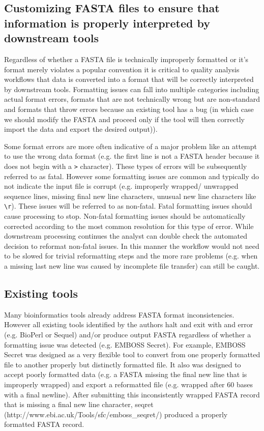 \subsection{Customizing FASTA files to ensure that information is properly interpreted by downstream tools}

Regardless of whether a FASTA file is technically improperly formatted or it's format merely violates a popular convention it is critical to quality analysis workflows that data is converted into a format that will be correctly interpreted by downstream tools. Formatting issues can fall into multiple categories including actual format errors, formats that are not technically wrong but are non-standard and formats that throw errors because an existing tool has a bug (in which case we should modify the FASTA and proceed only if the tool will then correctly import the data and export the desired output)). 

Some format errors are more often indicative of a major problem like an attempt to use the wrong data format (e.g. the first line is not a FASTA header because it does not begin with a \verb|>| character). These types of errors will be subsequently referred to as fatal. However some formatting issues are common and typically do not indicate the input file is corrupt (e.g. improperly wrapped/ unwrapped sequence lines, missing final new line characters, unusual new line characters like \verb|\r|). These issues will be referred to as non-fatal. Fatal formatting issues should cause processing to stop. Non-fatal formatting issues should be automatically corrected according to the most common resolution for this type of error. While downstream processing continues the analyst can double check the automated decision to reformat non-fatal issues. In this manner the workflow would not need to be slowed for trivial reformatting steps and the more rare problems (e.g. when a missing last new line was caused by incomplete file transfer) can still be caught.
  
\subsection{Existing tools}

Many bioinformatics tools already address FASTA format inconsistencies. However all existing tools identified by the authors halt and exit with and error (e.g. BioPerl or Sequel) and/or produce output FASTA regardless of whether a formatting issue was detected (e.g. EMBOSS Secret). For example, EMBOSS Secret was designed as a very flexible tool to convert from one properly formatted file to another properly but distinctly formatted file. It also was designed to accept poorly formatted data (e.g. a FASTA missing the final new line that is improperly wrapped) and export a reformatted file (e.g. wrapped after 60 bases with a final newline). After submitting this inconsistently wrapped FASTA record that is missing a final new line character, seqret (http://www.ebi.ac.uk/Tools/sfc/emboss_seqret/) produced a properly formatted FASTA record.

